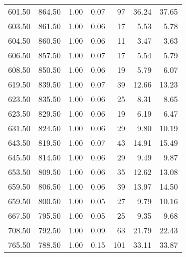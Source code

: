 \begin{table}
\begin{tabular}{rrrrrrr}
601.50 & 864.50 & 1.00 & 0.07 & 97 & 36.24 & 37.65 \\
603.50 & 861.50 & 1.00 & 0.06 & 17 & 5.53 & 5.78 \\
604.50 & 860.50 & 1.00 & 0.06 & 11 & 3.47 & 3.63 \\
606.50 & 857.50 & 1.00 & 0.07 & 17 & 5.54 & 5.79 \\
608.50 & 850.50 & 1.00 & 0.06 & 19 & 5.79 & 6.07 \\
619.50 & 839.50 & 1.00 & 0.07 & 39 & 12.66 & 13.23 \\
623.50 & 835.50 & 1.00 & 0.06 & 25 & 8.31 & 8.65 \\
623.50 & 829.50 & 1.00 & 0.06 & 19 & 6.19 & 6.47 \\
631.50 & 824.50 & 1.00 & 0.06 & 29 & 9.80 & 10.19 \\
643.50 & 819.50 & 1.00 & 0.07 & 43 & 14.91 & 15.49 \\
645.50 & 814.50 & 1.00 & 0.06 & 29 & 9.49 & 9.87 \\
653.50 & 809.50 & 1.00 & 0.06 & 35 & 12.62 & 13.08 \\
659.50 & 806.50 & 1.00 & 0.06 & 39 & 13.97 & 14.50 \\
659.50 & 800.50 & 1.00 & 0.05 & 27 & 9.79 & 10.16 \\
667.50 & 795.50 & 1.00 & 0.05 & 25 & 9.35 & 9.68 \\
708.50 & 792.50 & 1.00 & 0.09 & 63 & 21.79 & 22.43 \\
765.50 & 788.50 & 1.00 & 0.15 & 101 & 33.11 & 33.87 \\
\bottomrule
\end{tabular}
\end{table}
